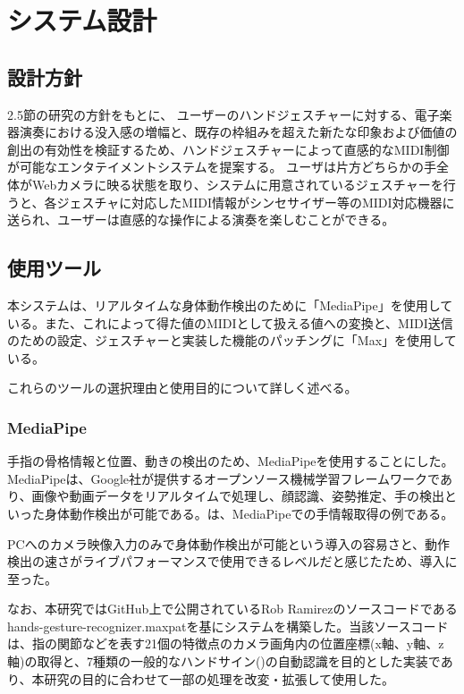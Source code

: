 \section{システム設計}

\subsection{設計方針}
2.5節の研究の方針をもとに、
ユーザーのハンドジェスチャーに対する、電子楽器演奏における没入感の増幅と、既存の枠組みを超えた新たな印象および価値の創出の有効性を検証するため、ハンドジェスチャーによって直感的なMIDI制御が可能なエンタテイメントシステムを提案する。
ユーザは片方どちらかの手全体がWebカメラに映る状態を取り、システムに用意されているジェスチャーを行うと、各ジェスチャに対応したMIDI情報がシンセサイザー等のMIDI対応機器に送られ、ユーザーは直感的な操作による演奏を楽しむことができる。

\subsection{使用ツール}
本システムは、リアルタイムな身体動作検出のために「MediaPipe」を使用している。また、これによって得た値のMIDIとして扱える値への変換と、MIDI送信のための設定、ジェスチャーと実装した機能のパッチングに「Max」を使用している。

これらのツールの選択理由と使用目的について詳しく述べる。

\subsubsection{MediaPipe}
手指の骨格情報と位置、動きの検出のため、MediaPipeを使用することにした\cite{MediaPipe}。MediaPipeは、Google社が提供するオープンソース機械学習フレームワークであり、画像や動画データをリアルタイムで処理し、顔認識、姿勢推定、手の検出といった身体動作検出が可能である。は、MediaPipeでの手情報取得の例である。

PCへのカメラ映像入力のみで身体動作検出が可能という導入の容易さと、動作検出の速さがライブパフォーマンスで使用できるレベルだと感じたため、導入に至った。

なお、本研究ではGitHub上で公開されているRob Ramirezのソースコードであるhands-gesture-recognizer.maxpatを基にシステムを構築した\cite{Jwebmediapipe}。当該ソースコードは、指の関節などを表す21個の特徴点のカメラ画角内の位置座標(x軸、y軸、z軸)の取得と、7種類の一般的なハンドサイン()の自動認識を目的とした実装であり、本研究の目的に合わせて一部の処理を改変・拡張して使用した。


